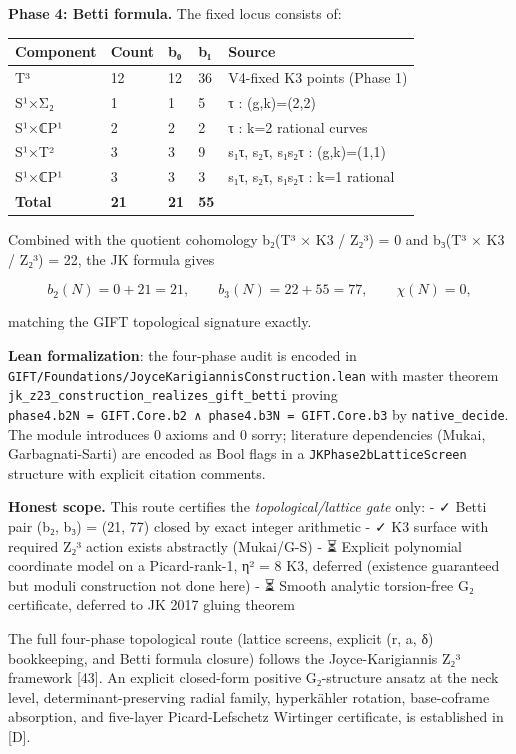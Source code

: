 \documentclass[11pt,a4paper]{article}
\begin{document}
{{{{{{{{{{{{{{{\textbf{Phase 4: Betti formula.} The fixed locus consists of:

{\def\LTcaptype{none} %
\begin{longtable}[]{@{}lllll@{}}
\toprule\noalign{}
Component & Count & b₀ & b₁ & Source \\
\midrule\noalign{}
\endhead
\bottomrule\noalign{}
\endlastfoot
T³ & 12 & 12 & 36 & V4-fixed K3 points (Phase 1) \\
S¹×Σ₂ & 1 & 1 & 5 & τ : (g,k)=(2,2) \\
S¹×ℂP¹ & 2 & 2 & 2 & τ : k=2 rational curves \\
S¹×T² & 3 & 3 & 9 & s₁τ, s₂τ, s₁s₂τ : (g,k)=(1,1) \\
S¹×ℂP¹ & 3 & 3 & 3 & s₁τ, s₂τ, s₁s₂τ : k=1 rational \\
\textbf{Total} & \textbf{21} & \textbf{21} & \textbf{55} & \\
\end{longtable}
Combined with the quotient cohomology b₂(T³ × K3 / Z₂³) = 0 and b₃(T³ × K3 / Z₂³) = 22, the JK formula gives

\[b_2(N) = 0 + 21 = 21, \qquad b_3(N) = 22 + 55 = 77, \qquad \chi(N) = 0,\]

matching the GIFT topological signature exactly.

\textbf{Lean formalization}: the four-phase audit is encoded in \texttt{GIFT/Foundations/JoyceKarigiannisConstruction.lean} with master theorem \texttt{jk\_z23\_construction\_realizes\_gift\_betti} proving \texttt{phase4.b2N\ =\ GIFT.Core.b2\ ∧\ phase4.b3N\ =\ GIFT.Core.b3} by \texttt{native\_decide}. The module introduces 0 axioms and 0 sorry; literature dependencies (Mukai, Garbagnati-Sarti) are encoded as Bool flags in a \texttt{JKPhase2bLatticeScreen} structure with explicit citation comments.

\textbf{Honest scope.} This route certifies the \emph{topological/lattice gate} only:
- ✓ Betti pair (b₂, b₃) = (21, 77) closed by exact integer arithmetic
- ✓ K3 surface with required Z₂³ action exists abstractly (Mukai/G-S)
- ⏳ Explicit polynomial coordinate model on a Picard-rank-1, η² = 8 K3, deferred (existence guaranteed but moduli construction not done here)
- ⏳ Smooth analytic torsion-free G₂ certificate, deferred to JK 2017 gluing theorem

The full four-phase topological route (lattice screens, explicit (r, a, δ) bookkeeping, and Betti formula closure) follows the Joyce-Karigiannis Z₂³ framework [43]. An explicit closed-form positive G₂-structure ansatz at the neck level, determinant-preserving radial family, hyperkähler rotation, base-coframe absorption, and five-layer Picard-Lefschetz Wirtinger certificate, is established in [D].

}}}}}}}}}}}}}}}}
\end{document}
